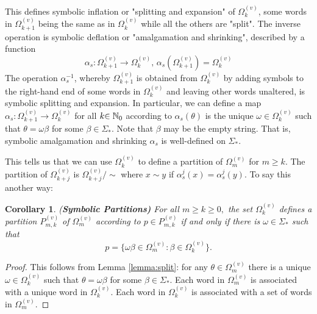 \documentclass{amsproc}
\theoremstyle{plain}
\newtheorem{corollary}{Corollary}
\theoremstyle{definition}
\numberwithin{equation}{section}
\begin{document}
This defines symbolic inflation or "splitting and expansion" of $\Omega
_{k}^{(v)}$, some words in $\Omega_{k+1}^{(v)}$ being the same as in $%
\Omega_{k}^{(v)}$ while all the others are "split". The inverse operation is
symbolic deflation or "amalgamation and shrinking", described by a function%
\begin{equation*}
\alpha_{s}:\Omega_{k+1}^{(v)}\rightarrow\Omega_{k}^{(v)}\text{, }\alpha
_{s}(\Omega_{k+1}^{(v)})=\Omega_{k}^{(v)}
\end{equation*}
The operation $\alpha_{s}^{-1}$, whereby $\Omega_{k+1}^{(v)}$ is obtained
from $\Omega_{k}^{(v)}$ by adding symbols to the right-hand end of some
words in $\Omega_{k}^{(v)}$ and leaving other words unaltered, is symbolic
splitting and expansion. In particular, we can define a map $%
\alpha_{s}:\Omega _{k+1}^{(v)}\rightarrow\Omega_{k}^{(v)}$ for all $k\mathbb{%
\in N}_{0}$ according to $\alpha_{s}(\theta)$ is the unique $%
\omega\in\Omega_{k}^{(v)}$ such that $\theta=\omega\beta$ for some $%
\beta\in\Sigma_{\ast}$. Note that $\beta$ may be the empty string. That is,
symbolic amalgamation and shrinking $\alpha_{s}$ is well-defined on $%
\Sigma_{\ast}$.

This tells us that we can use $\Omega_{k}^{(v)}$ to define a partition of $%
\Omega_{m}^{(v)}$ for $m\geq k$. The partition of $\Omega_{k+j}^{(v)}$ is $%
\Omega_{k+j}^{(v)}/\sim$ where $x\sim y$ if $\alpha_{s}^{j}(x)=%
\alpha_{s}^{j}(y)$. To say this another way:

\begin{corollary}
\label{cor:partition}(\textbf{Symbolic Partitions)} For all $m\geq k\geq0,$
the set $\Omega_{k}^{(v)}$ defines a partition $P_{m,k}^{(v)}$ of $\Omega
_{m}^{(v)}$ according to $p\in P_{m,k}^{(v)}$ if and only if there is $%
\omega\in\Sigma_{\ast}$ such that 
\begin{equation*}
p=\{\omega\beta\in\Omega_{m}^{(v)}:\beta\in\Omega_{k}^{(v)}\}.
\end{equation*}
\end{corollary}

\begin{proof}
This follows from Lemma \ref{lemma:split}: for any $\theta\in%
\Omega_{m}^{(v)} $ there is a unique $\omega\in\Omega_{k}^{(v)}$ such that $%
\theta=\omega\beta $ for some $\beta\in\Sigma_{\ast}$. Each word in $%
\Omega_{m}^{(v)}$ is associated with a unique word in $\Omega_{k}^{(v)}$.
Each word in $\Omega _{k}^{(v)}$ is associated with a set of words in $%
\Omega_{m}^{(v)}$.
\end{proof}
\end{document}

